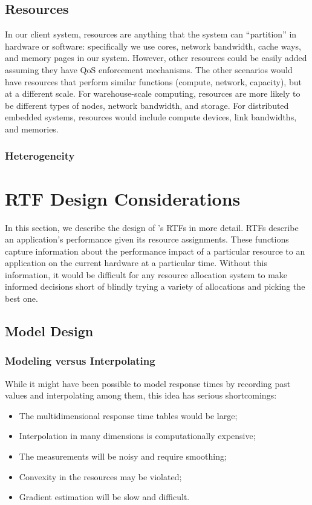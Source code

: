 \subsection{Resources}

In our client system, resources are anything that the system can
``partition'' in hardware or software: specifically we use cores,
network bandwidth, cache ways, and memory pages in our system.
However, other resources could be easily added assuming they have QoS
enforcement mechanisms.  The other scenarios would have resources that
perform similar functions (compute, network, capacity), but at a
different scale. For warehouse-scale computing, resources are more
likely to be different types of nodes, network bandwidth, and
storage. For distributed embedded systems, resources would include
compute devices, link bandwidths, and memories.

\subsubsection{Heterogeneity}
\section{RTF Design Considerations}\label{RTFs}
In this section, we describe the design of \pacora's RTFs in more detail.
RTFs describe an application's performance given its resource assignments.  These functions capture information about the performance impact of a particular resource to an application on the current hardware at a particular time. Without this information, it would be difficult for any resource allocation system to make informed decisions short of blindly trying a variety of allocations and picking the best one.

\subsection{Model Design}
\subsubsection{Modeling versus Interpolating} While it might have been possible to model response times by recording past values and interpolating among them, this idea has serious shortcomings:
\begin{itemize}
\item The multidimensional response time tables would be large;
\item Interpolation in many dimensions is computationally expensive;
\item The measurements will be noisy and require smoothing;
\item Convexity in the resources may be violated;
\item Gradient estimation will be slow and difficult.
\end{itemize}

